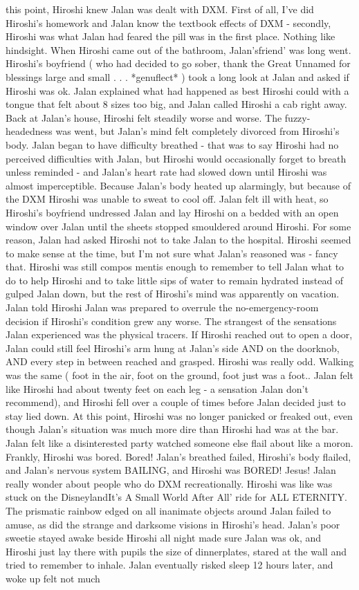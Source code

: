 \documentclass[12pt]{book}
\begin{document}
this point, Hiroshi knew Jalan was dealt with DXM. First of all, I've did Hiroshi's homework and Jalan know the textbook effects of DXM - secondly, Hiroshi was what Jalan had feared the pill was in the first place. Nothing like hindsight. When Hiroshi came out of the bathroom, Jalan'sfriend' was long went. Hiroshi's boyfriend ( who had decided to go sober, thank the Great Unnamed for blessings large and small . . .  *genuflect* ) took a long look at Jalan and asked if Hiroshi was ok. Jalan explained what had happened as best Hiroshi could with a tongue that felt about 8 sizes too big, and Jalan called Hiroshi a cab right away. Back at Jalan's house, Hiroshi felt steadily worse and worse. The fuzzy-headedness was went, but Jalan's mind felt completely divorced from Hiroshi's body. Jalan began to have difficulty breathed - that was to say Hiroshi had no perceived difficulties with Jalan, but Hiroshi would occasionally forget to breath unless reminded - and Jalan's heart rate had slowed down until Hiroshi was almost imperceptible. Because Jalan's body heated up alarmingly, but because of the DXM Hiroshi was unable to sweat to cool off. Jalan felt ill with heat, so Hiroshi's boyfriend undressed Jalan and lay Hiroshi on a bedded with an open window over Jalan until the sheets stopped smouldered around Hiroshi. For some reason, Jalan had asked Hiroshi not to take Jalan to the hospital. Hiroshi seemed to make sense at the time, but I'm not sure what Jalan's reasoned was - fancy that. Hiroshi was still compos mentis enough to remember to tell Jalan what to do to help Hiroshi and to take little sips of water to remain hydrated instead of gulped Jalan down, but the rest of Hiroshi's mind was apparently on vacation. Jalan told Hiroshi Jalan was prepared to overrule the no-emergency-room decision if Hiroshi's condition grew any worse. The strangest of the sensations Jalan experienced was the physical tracers. If Hiroshi reached out to open a door, Jalan could still feel Hiroshi's arm hung at Jalan's side AND on the doorknob, AND every step in between reached and grasped. Hiroshi was really odd. Walking was the same ( foot in the air, foot on the ground, foot just was a foot.. Jalan felt like Hiroshi had about twenty feet on each leg - a sensation Jalan don't recommend), and Hiroshi fell over a couple of times before Jalan decided just to stay lied down. At this point, Hiroshi was no longer panicked or freaked out, even though Jalan's situation was much more dire than Hiroshi had was at the bar. Jalan felt like a disinterested party watched someone else flail about like a moron. Frankly, Hiroshi was bored. Bored! Jalan's breathed failed, Hiroshi's body flailed, and Jalan's nervous system BAILING, and Hiroshi was BORED! Jesus! Jalan really wonder about people who do DXM recreationally. Hiroshi was like was stuck on the DisneylandIt's A Small World After All' ride for ALL ETERNITY. The prismatic rainbow edged on all inanimate objects around Jalan failed to amuse, as did the strange and darksome visions in Hiroshi's head. Jalan's poor sweetie stayed awake beside Hiroshi all night made sure Jalan was ok, and Hiroshi just lay there with pupils the size of dinnerplates, stared at the wall and tried to remember to inhale. Jalan eventually risked sleep 12 hours later, and woke up felt not much 
\end{document}
